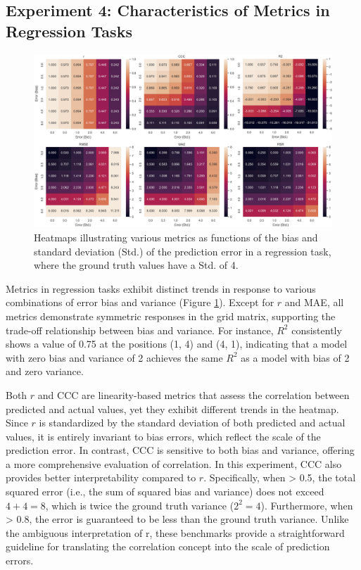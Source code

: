 \subsection{Experiment 4: Characteristics of Metrics in Regression Tasks}

\begin{figure}[H]
    \centering
    \includegraphics[width=1\textwidth]{fig_9.jpg}
    \caption{Heatmaps illustrating various metrics as functions of the bias and standard deviation (Std.) of the prediction error in a regression task, where the ground truth values have a Std. of 4.}
    \label{fig:s4_reg}
\end{figure}

Metrics in regression tasks exhibit distinct trends in response to various combinations of error bias and variance (Figure \ref{fig:s4_reg}). Except for $r$ and MAE, all metrics demonstrate symmetric responses in the grid matrix, supporting the trade-off relationship between bias and variance. For instance, $R^2$ consistently shows a value of 0.75 at the positions (1, 4) and (4, 1), indicating that a model with zero bias and variance of 2 achieves the same $R^2$ as a model with bias of 2 and zero variance.

Both $r$ and CCC are linearity-based metrics that assess the correlation between predicted and actual values, yet they exhibit different trends in the heatmap. Since $r$ is standardized by the standard deviation of both predicted and actual values, it is entirely invariant to bias errors, which reflect the scale of the prediction error. In contrast, CCC is sensitive to both bias and variance, offering a more comprehensive evaluation of correlation. In this experiment, CCC also provides better interpretability compared to $r$. Specifically, when  > 0.5, the total squared error (i.e., the sum of squared bias and variance) does not exceed $4 + 4 = 8$, which is twice the ground truth variance ($2^2 = 4$). Furthermore, when  > 0.8, the error is guaranteed to be less than the ground truth variance. Unlike the ambiguous interpretation of r, these benchmarks provide a straightforward guideline for translating the correlation concept into the scale of prediction errors.

